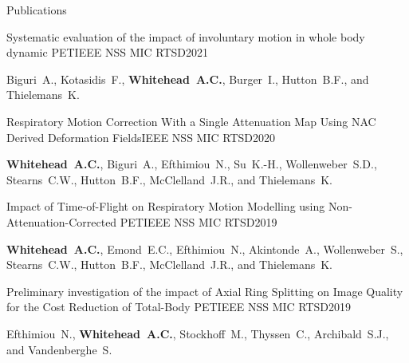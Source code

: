 \documentclass{cv}
\begin{document}
\begin{spacing}{1.0}
\begin{rSection}{Publications}
            \item \begin{rSubsection}{Systematic evaluation of the impact of involuntary motion in whole body dynamic PET}{}{IEEE NSS MIC RTSD}{2021}
                \item Biguri~A., Kotasidis~F., \textbf{Whitehead~A.C.}, Burger~I., Hutton~B.F., and Thielemans~K.
            \end{rSubsection}
            
            \item \begin{rSubsection}{Respiratory Motion Correction With a Single Attenuation Map Using NAC Derived Deformation Fields}{}{IEEE NSS MIC RTSD}{2020}
                \item \textbf{Whitehead~A.C.}, Biguri~A., Efthimiou~N., Su~K.-H., Wollenweber~S.D., Stearns~C.W., Hutton~B.F., McClelland~J.R., and Thielemans~K.
            \end{rSubsection}
            
            \item \begin{rSubsection}{Impact of Time-of-Flight on Respiratory Motion Modelling using Non-Attenuation-Corrected \newline PET}{}{IEEE NSS MIC RTSD}{2019}
                \item \textbf{Whitehead~A.C.}, Emond~E.C., Efthimiou~N., Akintonde~A., Wollenweber~S., Stearns~C.W., Hutton~B.F., McClelland~J.R., and Thielemans~K.
            \end{rSubsection}
            
            \item \begin{rSubsection}{Preliminary investigation of the impact of Axial Ring Splitting on Image Quality for the Cost Reduction of Total-Body PET}{}{IEEE NSS MIC RTSD}{2019}
                \item Efthimiou~N., \textbf{Whitehead~A.C.}, Stockhoff~M., Thyssen~C., Archibald~S.J., and Vandenberghe~S.
            \end{rSubsection}
        \end{rSection}
        

\end{spacing}
\end{document}
